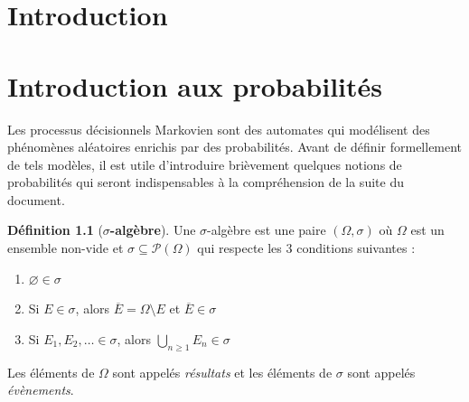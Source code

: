 \documentclass[12pt,a4paper]{report}
\theoremstyle{definition}%
\newtheorem{definition}{Définition}[chapter]
\theoremstyle{remark}
\begin{document}
\newpage
\tableofcontents
\listoftheorems[ignoreall,show={definition,theorem}]
\newpage

\chapter*{Introduction}

\chapter{Introduction aux probabilités}
Les processus décisionnels Markovien sont des automates qui modélisent des phénomènes aléatoires enrichis par des probabilités. Avant de définir formellement de tels modèles, il est utile d'introduire brièvement quelques notions de probabilités qui seront indispensables à la compréhension de la suite du document.

\begin{definition}[\textbf{$\sigma$-algèbre}]
	Une $\sigma$-algèbre est une paire $(\Omega, \sigma)$ où $\Omega$ est un ensemble non-vide et $\sigma \subseteq \mathcal{P}(\Omega)$ qui respecte les $3$ conditions suivantes :
	\begin{enumerate}
		\item $\varnothing \in \sigma$
		\item Si $E \in \sigma$, alors $\overline{E} = \Omega \setminus E$ et $\overline{E} \in \sigma$
		\item Si $E_1, E_2, \dots \in \sigma$, alors $\bigcup_{n \geq 1} E_n \in \sigma$
	\end{enumerate}
	Les éléments de $\Omega$ sont appelés \textit{résultats} et les éléments de $\sigma$ sont appelés \textit{évènements}.
\end{definition}
\end{document}
